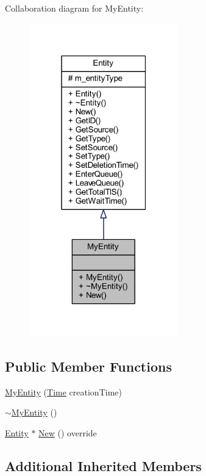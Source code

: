 Collaboration diagram for My\+Entity\+:
\nopagebreak
\begin{figure}[H]
\begin{center}
\leavevmode
\includegraphics[width=183pt]{class_my_entity__coll__graph}
\end{center}
\end{figure}
\subsection*{Public Member Functions}
\begin{DoxyCompactItemize}
\item 
\hyperlink{class_my_entity_a2ef0bc770ce958c4f51c453e870d3478}{My\+Entity} (\hyperlink{_simulation_executive_8h_ac2d3e0ba793497bcca555c7c2cf64ff3}{Time} creation\+Time)
\item 
\hyperlink{class_my_entity_ac575adbb2632db8db827e9453998b611}{$\sim$\+My\+Entity} ()
\item 
\hyperlink{class_entity}{Entity} $\ast$ \hyperlink{class_my_entity_acc29e753a0df1928eb4c9e627d65a3b3}{New} () override
\end{DoxyCompactItemize}
\subsection*{Additional Inherited Members}


